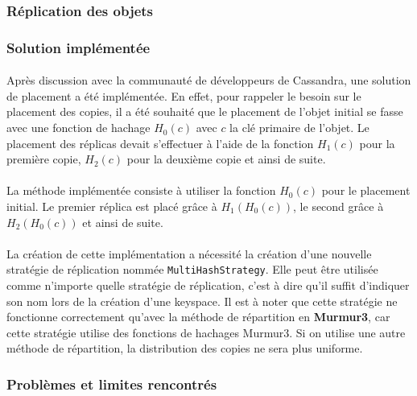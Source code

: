 \documentclass[12pt]{article}
\newcommand{\class}[1]{\texttt{#1}}
\begin{document}
\subsubsection{Réplication des objets}

\subsubsection*{Solution implémentée}

\paragraph{}Après discussion avec la communauté de développeurs de Cassandra, une solution de placement a été implémentée. En effet, pour rappeler le besoin sur le placement des copies, il a été souhaité que le placement de l'objet initial se fasse avec une fonction de hachage $ H_0 (c) $ avec $c$ la clé primaire de l'objet. Le placement des réplicas devait s'effectuer à l'aide de la fonction $ H_1 (c) $ pour la première copie, $H_2 (c) $ pour la deuxième copie et ainsi de suite.

\paragraph{}La méthode implémentée consiste à utiliser la fonction $ H_0 (c) $ pour le placement initial. Le premier réplica est placé grâce à $ H_1 (H_0 (c)) $, le second grâce à $ H_2 (H_0 (c)) $ et ainsi de suite.

\paragraph{}La création de cette implémentation a nécessité la création d'une nouvelle stratégie de réplication nommée \class{MultiHashStrategy}. Elle peut être utilisée comme n'importe quelle stratégie de réplication, c'est à dire qu'il suffit d'indiquer son nom lors de la création d'une keyspace. Il est à noter que cette stratégie ne fonctionne correctement qu'avec la méthode de répartition en \textbf{Murmur3}, car cette stratégie utilise des fonctions de hachages Murmur3. Si on utilise une autre méthode de répartition, la distribution des copies ne sera plus uniforme.

\subsubsection*{Problèmes et limites rencontrés}
\end{document}
